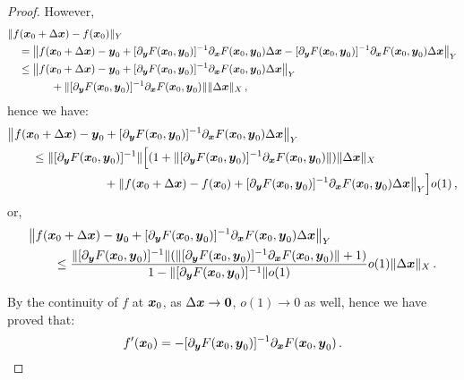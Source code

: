 \documentclass[openany]{book}
\begin{document}
\begin{proof}
	However, 
	\begin{align*}
		&\|f(\boldsymbol{x}_0 + \Delta \boldsymbol{x}) - f(\boldsymbol{x}_0)\|_Y 
		\\
		&\quad
		= \big\| f(\boldsymbol{x}_0 + \Delta \boldsymbol{x}) - \boldsymbol{y}_0 
		+ [\partial_{\boldsymbol{y}} F(\boldsymbol{x}_0, \boldsymbol{y}_0)]^{-1} \partial_{\boldsymbol{x}} F(\boldsymbol{x}_0, \boldsymbol{y}_0) 
			\Delta \boldsymbol{x} 
			- [\partial_{\boldsymbol{y}} F(\boldsymbol{x}_0, \boldsymbol{y}_0)]^{-1} \partial_{\boldsymbol{x}} F(\boldsymbol{x}_0, \boldsymbol{y}_0) 
			\Delta \boldsymbol{x} 
		\big\|_Y
		\\
		&\quad
		\leq \big\| f(\boldsymbol{x}_0 + \Delta \boldsymbol{x}) - \boldsymbol{y}_0 
		+ [\partial_{\boldsymbol{y}} F(\boldsymbol{x}_0, \boldsymbol{y}_0)]^{-1} \partial_{\boldsymbol{x}} F(\boldsymbol{x}_0, \boldsymbol{y}_0) 
			\Delta \boldsymbol{x} \big\|_Y 
		\\&\qquad\qquad
		+ \|[\partial_{\boldsymbol{y}} F(\boldsymbol{x}_0, \boldsymbol{y}_0)]^{-1} \partial_{\boldsymbol{x}} F(\boldsymbol{x}_0, \boldsymbol{y}_0)\| 
			\|\Delta \boldsymbol{x}\|_X\,,
	\end{align*}
	hence we have:
	\begin{align*}
		&\big\| f(\boldsymbol{x}_0 + \Delta \boldsymbol{x}) - \boldsymbol{y}_0 
		+ [\partial_{\boldsymbol{y}} F(\boldsymbol{x}_0, \boldsymbol{y}_0)]^{-1} \partial_{\boldsymbol{x}} F(\boldsymbol{x}_0, \boldsymbol{y}_0) 
			\Delta \boldsymbol{x} \big\|_Y
		\\&\qquad
		\leq
		\| [\partial_{\boldsymbol{y}} F(\boldsymbol{x}_0, \boldsymbol{y}_0)]^{-1} \| 
			\Big[
				(1 + \|[\partial_{\boldsymbol{y}} F(\boldsymbol{x}_0, \boldsymbol{y}_0)]^{-1} \partial_{\boldsymbol{x}} F(\boldsymbol{x}_0, \boldsymbol{y}_0)\|)\|\Delta \boldsymbol{x}\|_X 
		\\&\qquad\qquad\qquad\qquad
				+ \|f(\boldsymbol{x}_0 + \Delta \boldsymbol{x}) - f(\boldsymbol{x}_0) + [\partial_{\boldsymbol{y}} F(\boldsymbol{x}_0, \boldsymbol{y}_0)]^{-1} \partial_{\boldsymbol{x}} F(\boldsymbol{x}_0, \boldsymbol{y}_0) 
			\Delta \boldsymbol{x} \big\|_Y \Big] o(1) \,,
	\end{align*}
	or,
	\begin{align*}
		&\big\| f(\boldsymbol{x}_0 + \Delta \boldsymbol{x}) - \boldsymbol{y}_0 
		+ [\partial_{\boldsymbol{y}} F(\boldsymbol{x}_0, \boldsymbol{y}_0)]^{-1} \partial_{\boldsymbol{x}} F(\boldsymbol{x}_0, \boldsymbol{y}_0) 
			\Delta \boldsymbol{x} \big\|_Y
		\\&\qquad
		\leq
		\frac{\| [\partial_{\boldsymbol{y}} F(\boldsymbol{x}_0, \boldsymbol{y}_0)]^{-1} \| (\|[\partial_{\boldsymbol{y}} F(\boldsymbol{x}_0, \boldsymbol{y}_0)]^{-1} \partial_{\boldsymbol{x}} F(\boldsymbol{x}_0, \boldsymbol{y}_0)\| + 1) }
		{1 - \| [\partial_{\boldsymbol{y}} F(\boldsymbol{x}_0, \boldsymbol{y}_0)]^{-1} \| o(1) } o(1) \|\Delta \boldsymbol{x}\|_X\,.
	\end{align*}

	By the continuity of $f$ at $\boldsymbol{x}_0$, as $\Delta \boldsymbol{x} \to \boldsymbol{0}$, $o(1) \to 0$ as well, hence we have proved that: 
	\begin{equation*}
		f'(\boldsymbol{x}_0) 
			= -[\partial_{\boldsymbol{y}} F(\boldsymbol{x}_0, \boldsymbol{y}_0)]^{-1} \partial_{\boldsymbol{x}} F(\boldsymbol{x}_0, \boldsymbol{y}_0)\,. 
	\end{equation*}
\end{proof}
\end{document}
